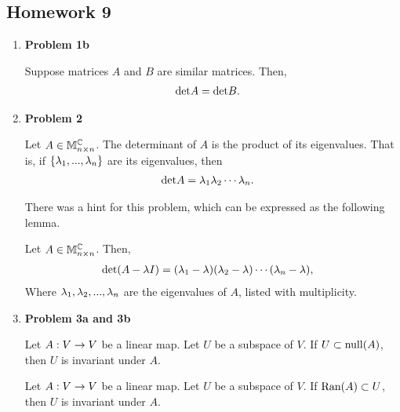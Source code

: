 \subsection{Homework 9}
\begin{enumerate}
    \item[] \textbf{Problem 1b}
    \begin{lemma}
        Suppose matrices $A$ and $B$ are similar matrices. Then,
        \begin{align*}
            \text{det} A &= \text{det} B.
        \end{align*}
    \end{lemma}
    \item[] \textbf{Problem 2}
    \begin{lemma}
        Let $A \in \mathbb{M}^{\mathbb{C}}_{n \times n}$. The determinant of $A$ is the product of its eigenvalues. That is, if $\{ \lambda_1 , ..., \lambda_n \}$ are its
        eigenvalues, then
        \begin{align*}
            \text{det} A &= \lambda_1 \lambda_2 \cdots \lambda_n.
        \end{align*}
    \end{lemma}

    There was a hint for this problem, which can be expressed as the following lemma.
    \begin{lemma}
        Let $A \in \mathbb{M}^{\mathbb{C}}_{n \times n}$. Then,
        \begin{align*}
            \text{det} (A - \lambda I) &= (\lambda_1 - \lambda) (\lambda_2 - \lambda) \cdots (\lambda_n - \lambda),
        \end{align*}
        Where $\lambda_1, \lambda_2, ..., \lambda_n$ are the eigenvalues of $A$, listed with multiplicity.
    \end{lemma}

    \item[] \textbf{Problem 3a and 3b}
    \begin{lemma}
        Let $A: V \rightarrow V$ be a linear map. Let $U$ be a subspace of $V$. If $U \subset \text{null}(A)$, then $U$ is invariant under $A$.
    \end{lemma}
    \begin{lemma}
        Let $A: V \rightarrow V$ be a linear map. Let $U$ be a subspace of $V$. If $\text{Ran}(A) \subset U$, then $U$ is invariant under $A$.
    \end{lemma}
\end{enumerate}